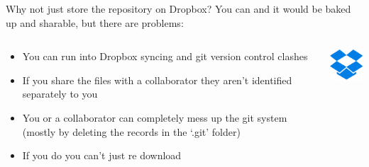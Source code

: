 \documentclass[10pt]{beamer}
\begin{document}
{\begin{frame}[fragile]{Why not just store the repository on Dropbox?}
You can and it would be baked up and sharable, but there are problems:\\
\begin{columns}[T]
\begin{column}{.8\textwidth}
\begin{itemize}
\item You can run into Dropbox syncing and git version control clashes
\item If you share the files with a collaborator they aren’t identified separately to you
\item You or a collaborator can completely mess up the git system (mostly by deleting the records in the `.git' folder)
\item If you do you can't just re download
\end{itemize}
\end{column}
\begin{column}{.2\textwidth}
\includegraphics[width=2cm]{Figs/git/Dropbox}
\end{column}
\end{columns}
\end{frame}


}
\end{document}
